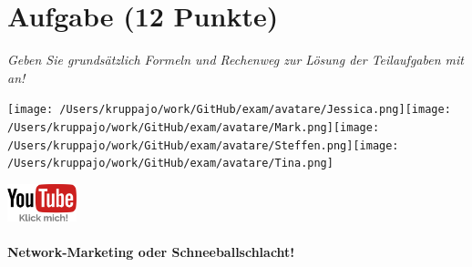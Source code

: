 \documentclass[a4paper, 9pt]{scrartcl}\usepackage[]{graphicx}\usepackage[]{xcolor}
\begin{document}
 
\clearpage

\section{Aufgabe \hfill (12 Punkte)}

\textit{Geben Sie grundsätzlich Formeln und Rechenweg zur Lösung der Teilaufgaben mit an!} \\[1Ex]
 

 
\ifcollection
\begin{flushright}
\tiny\vspace{-3Ex}
\textbf{\examinhaltstart}
\exammodulemathstat
\vspace{-4Ex}
\end{flushright}
\begin{minipage}[t]{0.5\textwidth}
\texttt{[image: /Users/kruppajo/work/GitHub/exam/avatare/Jessica.png]}\hspace{-4mm}\texttt{[image: /Users/kruppajo/work/GitHub/exam/avatare/Mark.png]}\hspace{-4mm}\texttt{[image: /Users/kruppajo/work/GitHub/exam/avatare/Steffen.png]}\hspace{-4mm}\texttt{[image: /Users/kruppajo/work/GitHub/exam/avatare/Tina.png]}
\end{minipage}
\begin{minipage}[t]{0.5\textwidth}
\hfill
\href{https://youtu.be/SZqp_vy3rgI}{\includegraphics[width = 2cm]{img/youtube}}
\end{minipage}
\fi



\ifcollection
\paragraph{Network-Marketing oder Schneeballschlacht!}
\fi
\end{document}
